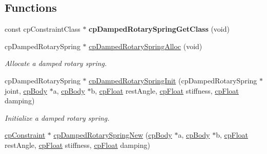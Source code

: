 \subsection*{Functions}
\begin{DoxyCompactItemize}
\item 
\hypertarget{group__cp_damped_rotary_spring_gae8c9008c7a9d5062e65db11eaa172731}{const cp\-Constraint\-Class $\ast$ {\bfseries cp\-Damped\-Rotary\-Spring\-Get\-Class} (void)}\label{group__cp_damped_rotary_spring_gae8c9008c7a9d5062e65db11eaa172731}

\item 
\hypertarget{group__cp_damped_rotary_spring_ga391ec6d5c1f7ebdd3d6aeaab1b525ece}{cp\-Damped\-Rotary\-Spring $\ast$ \hyperlink{group__cp_damped_rotary_spring_ga391ec6d5c1f7ebdd3d6aeaab1b525ece}{cp\-Damped\-Rotary\-Spring\-Alloc} (void)}\label{group__cp_damped_rotary_spring_ga391ec6d5c1f7ebdd3d6aeaab1b525ece}

\begin{DoxyCompactList}\small\item\em Allocate a damped rotary spring. \end{DoxyCompactList}\item 
\hypertarget{group__cp_damped_rotary_spring_gab1f484430f16708612d3972bea21abc0}{cp\-Damped\-Rotary\-Spring $\ast$ \hyperlink{group__cp_damped_rotary_spring_gab1f484430f16708612d3972bea21abc0}{cp\-Damped\-Rotary\-Spring\-Init} (cp\-Damped\-Rotary\-Spring $\ast$joint, \hyperlink{structcp_body}{cp\-Body} $\ast$a, \hyperlink{structcp_body}{cp\-Body} $\ast$b, \hyperlink{group__basic_types_gac1ed65573e035bf892505768c852d8d3}{cp\-Float} rest\-Angle, \hyperlink{group__basic_types_gac1ed65573e035bf892505768c852d8d3}{cp\-Float} stiffness, \hyperlink{group__basic_types_gac1ed65573e035bf892505768c852d8d3}{cp\-Float} damping)}\label{group__cp_damped_rotary_spring_gab1f484430f16708612d3972bea21abc0}

\begin{DoxyCompactList}\small\item\em Initialize a damped rotary spring. \end{DoxyCompactList}\item 
\hypertarget{group__cp_damped_rotary_spring_ga40e595bc6e077304ad3857c80118c5a4}{\hyperlink{structcp_constraint}{cp\-Constraint} $\ast$ \hyperlink{group__cp_damped_rotary_spring_ga40e595bc6e077304ad3857c80118c5a4}{cp\-Damped\-Rotary\-Spring\-New} (\hyperlink{structcp_body}{cp\-Body} $\ast$a, \hyperlink{structcp_body}{cp\-Body} $\ast$b, \hyperlink{group__basic_types_gac1ed65573e035bf892505768c852d8d3}{cp\-Float} rest\-Angle, \hyperlink{group__basic_types_gac1ed65573e035bf892505768c852d8d3}{cp\-Float} stiffness, \hyperlink{group__basic_types_gac1ed65573e035bf892505768c852d8d3}{cp\-Float} damping)}\label{group__cp_damped_rotary_spring_ga40e595bc6e077304ad3857c80118c5a4}


\end{DoxyCompactItemize}
